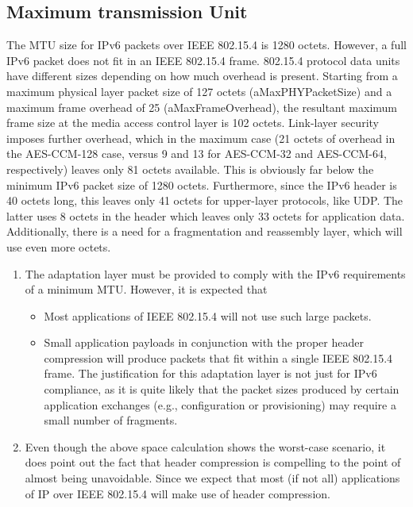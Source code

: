 \subsection{Maximum transmission Unit}
The MTU size for IPv6 packets over IEEE 802.15.4 is 1280 octets. However, a full IPv6 packet does not fit in an IEEE 802.15.4 frame. 802.15.4 protocol data units have different sizes depending on how much overhead is present.  Starting from a maximum physical layer packet size of 127 octets (aMaxPHYPacketSize) and a maximum frame overhead of 25 (aMaxFrameOverhead), the resultant maximum frame size at the media access control layer is 102 octets. Link-layer security imposes further overhead, which in the maximum case (21 octets of overhead in the AES-CCM-128 case, versus 9 and 13 for AES-CCM-32 and AES-CCM-64, respectively) leaves only 81 octets available.  This is obviously far below the minimum IPv6 packet size of 1280 octets. Furthermore, since the IPv6 header is 40 octets long, this leaves only 41 octets for upper-layer protocols, like UDP.  The latter uses 8 octets in the header which leaves only 33 octets for application data.  Additionally, there is a need for a fragmentation and reassembly layer, which will use even more octets.\\
\begin{enumerate}
	\item{The adaptation layer must be provided to comply with the IPv6 requirements of a minimum MTU.  However, it is expected that}
	\begin{itemize}
		\item Most applications of IEEE 802.15.4 will not use such large packets.
		\item Small application payloads in conjunction with the proper header compression will produce packets that fit within a single IEEE 802.15.4 frame.  The justification for this adaptation layer is not just for IPv6 compliance, as it is quite likely that the packet sizes produced by certain application exchanges (e.g., configuration or provisioning) may require a small number of fragments.
		\end{itemize}
	\item{Even though the above space calculation shows the worst-case scenario, it does point out the fact that header compression is compelling to the point of almost being unavoidable.  Since we expect that most (if not all) applications of IP over IEEE 802.15.4 will make use of header compression.}
\end{enumerate}
